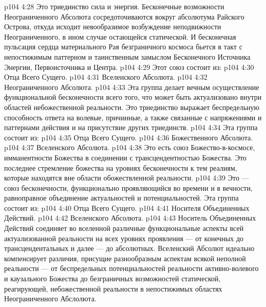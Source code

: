 \vs p104 4:28 Это триединство  сила и энергия. Бесконечные возможности Неограниченного Абсолюта сосредоточиваются вокруг абсолютума Райского Острова, откуда исходит невообразимое возбуждение неподвижности Неограниченного, в ином случае остающейся статической. И бесконечная пульсация сердца материального Рая безграничного космоса бьется в такт с непостижимым паттерном и таинственным замыслом Бесконечного Источника Энергии, Первоисточника и Центра.
\vs p104 4:29 \pc {} Этот союз состоит из:
\vs p104 4:30 \bibnobreakspace Отца Всего Сущего.
\vs p104 4:31 \bibnobreakspace Вселенского Абсолюта.
\vs p104 4:32 \bibnobreakspace Неограниченного Абсолюта.
\vs p104 4:33 \pc Эта группа делает вечным осуществление функциональной бесконечности всего того, что может быть актуализовано внутри областей небожественной реальности. Это триединство выражает беспредельную способность ответа на волевые, причинные, а также связанные с напряжениями и паттернами действия и на присутствие других триединств.
\vs p104 4:34 \pc {} Эта группа состоит из:
\vs p104 4:35 \bibnobreakspace Отца Всего Сущего.
\vs p104 4:36 \bibnobreakspace Божественного Абсолюта.
\vs p104 4:37 \bibnobreakspace Вселенского Абсолюта.
\vs p104 4:38 Это есть союз Божество\hyp{}в\hyp{}космосе, имманентности Божества в соединении с трансцендентностью Божества. Это последнее стремление божества на уровнях бесконечности к тем реалиям, которые находятся вне области обожествленной реальности.
\vs p104 4:39 \pc {} Это --- союз бесконечности, функционально проявляющийся во времени и в вечности, равноправное объединение актуальностей и потенциальностей. Эта группа состоит из:
\vs p104 4:40 \bibnobreakspace Отца Всего Сущего.
\vs p104 4:41 \bibnobreakspace Носителя Объединенных Действий.
\vs p104 4:42 \bibnobreakspace Вселенского Абсолюта.
\vs p104 4:43 \pc Носитель Объединенных Действий соединяет во вселенной различные функциональные аспекты всей актуализованной реальности на всех уровнях проявления --- от конечных до трансцендентальных и далее --- до абсолютных. Вселенский Абсолют идеально компенсирует различия, присущие разнообразным аспектам всякой неполной реальности --- от беспредельных потенциальностей реальности активно\hyp{}волевого и каузального Божества до безграничных возможностей статической, реагирующей, небожественной реальности в непостижимых областях Неограниченного Абслолюта.
